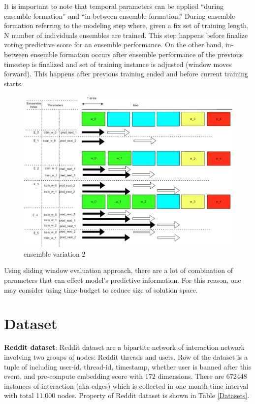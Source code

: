 \documentclass{IEEEtran}
\begin{document}
It is important to note that temporal parameters can be applied ``during ensemble formation'' and ``in-between ensemble formation.'' During ensemble formation referring to the modeling step where, given a fix set of training length, N number of individuals ensembles are trained. This step happens before finalize voting predictive score for an ensemble performance. On the other hand, in-between ensemble formation occurs after ensemble performance of the previous timestep is finalized and set of training instance is adjusted (window moves forward). This happens after previous training ended and before current training starts.

\begin{figure}[htbp]
\centering
\includegraphics[width=.9\linewidth]{./images/screenshot_20220425_110823.png}
\caption{\label{ensemble_variation_2}ensemble variation 2}
\end{figure}

Using sliding window evaluation approach, there are a lot of combination of parameters that can effect model's predictive information. For this reason, one may consider using time budget to reduce size of solution space.
\section{Dataset}
\label{sec:org5fed389}
\textbf{Reddit dataset}: Reddit dataset are a bipartite network of interaction network involving two groups of nodes: Reddit threads and users. Row of the dataset is a tuple of including user-id, thread-id, timestamp, whether user is banned after this event, and pre-compute embedding score with 172 dimensions. There are 672448 instances of interaction (aka edges) which is collected in one month time interval with total 11,000 nodes. Property of Reddit dataset is shown in Table \ref{Datasets}.
\end{document}
